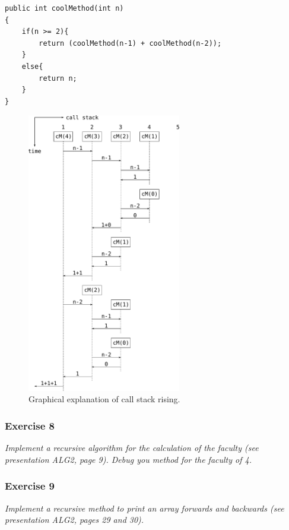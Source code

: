 \begin{lstlisting}
public int coolMethod(int n)
{
	if(n >= 2){
		return (coolMethod(n-1) + coolMethod(n-2));
	} 
	else{
		return n;
	}
}
\end{lstlisting}

\begin{figure}[h!]
	\centering
	\includegraphics[width=0.6\textwidth]{callstack.pdf}
	\caption{Graphical explanation of call stack rising.}
	\label{pic:callstack}
\end{figure}

\newpage
\subsubsection*{Exercise 8}
\textit{Implement a recursive algorithm for the calculation of the
faculty (see presentation ALG2, page 9). Debug you method for the
faculty of 4.} \\



\subsubsection*{Exercise 9}
\textit{Implement a recursive method to print an array forwards and
 backwards (see presentation ALG2, pages 29 and 30).} \\


